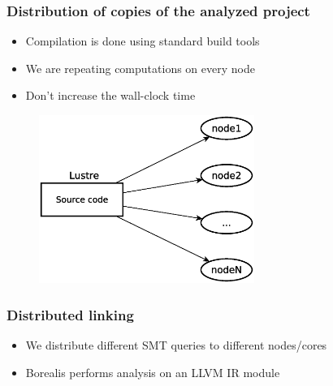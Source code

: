 \begin{frame}
\frametitle{Distribution of copies of the analyzed project}
\begin{itemize}
\item Compilation is done using standard build tools
\item We are repeating computations on every node
\item Don't increase the wall-clock time
\end{itemize}
	\begin{figure}
		\includegraphics[width=70mm]{image/compSource}
	\end{figure}	
\end{frame}

\begin{frame}
\frametitle{Distributed linking}
\begin{itemize}
	\item We distribute different SMT queries to different nodes/cores 
	\item Borealis performs analysis on an LLVM IR module
\end{itemize}
\end{frame}

